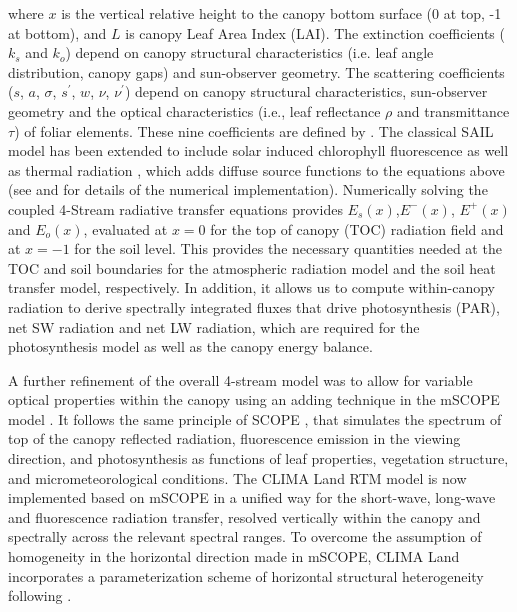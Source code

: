 \documentclass[twoside,10pt]{report}
\begin{document}
\noindent where $x$ is the vertical relative height to the canopy bottom surface (0 at top, -1 at bottom), and $L$ is canopy Leaf Area Index (LAI). The extinction coefficients ($k_s$ and $k_o$) depend on canopy structural characteristics (i.e. leaf angle distribution, canopy gaps) and sun-observer geometry. The scattering coefficients ($s$, $a$, $\sigma$, $s^\prime$, $w$, $\nu$, $\nu^\prime$) depend on canopy structural characteristics, sun-observer geometry and the optical characteristics (i.e., leaf reflectance $\rho$ and transmittance $\tau$) of foliar elements. These nine coefficients are defined by \citet{Verhoef1984}. The classical SAIL model has been extended to include solar induced chlorophyll fluorescence as well as thermal radiation \citep{VanderTol2009, Vilfan2016, verhoef2007unified}, which adds diffuse source functions to the equations above (see \citet{verhoef2007unified} and \citet{VanderTol2009} for details of the numerical implementation). Numerically solving the coupled 4-Stream radiative transfer equations provides $E_s(x)$,$E^-(x)$, $E^+(x)$ and $E_o(x)$, evaluated at $x=0$ for the top of canopy (TOC) radiation field and at $x=-1$ for the soil level. This provides the necessary quantities needed at the TOC and soil boundaries for the atmospheric radiation model and the soil heat transfer model, respectively. In addition, it allows us to compute within-canopy radiation to derive spectrally integrated fluxes that drive photosynthesis (PAR), net SW radiation and net LW radiation, which are required for the photosynthesis model as well as the canopy energy balance.     

A further refinement of the overall 4-stream model was to allow for variable optical properties within the canopy using an adding technique in the mSCOPE model \citep{Yang2017}. It follows the same principle of SCOPE \citep{VanderTol2009}, that simulates the spectrum of top of the canopy reflected radiation, fluorescence emission in the viewing direction, and photosynthesis as functions of leaf properties, vegetation structure, and micrometeorological conditions. The CLIMA Land RTM model is now implemented based on mSCOPE in a unified way for the short-wave, long-wave and fluorescence radiation transfer, resolved vertically within the canopy and spectrally across the relevant spectral ranges. To overcome the assumption of homogeneity in the horizontal direction made in mSCOPE, CLIMA Land incorporates a parameterization scheme of horizontal structural heterogeneity following \citet{pinty2006simplifying}.    
\end{document}
